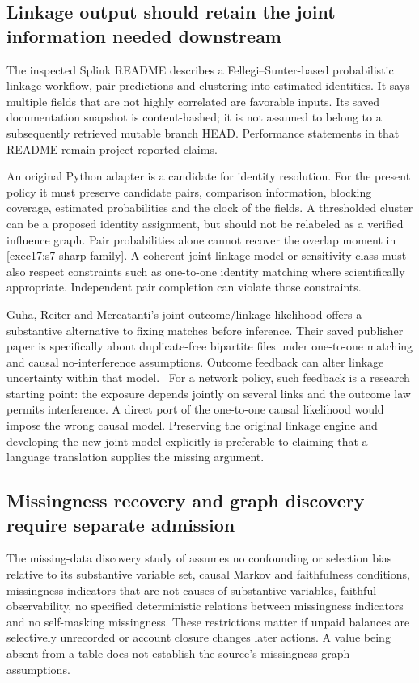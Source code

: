 \subsection{Linkage output should retain the joint information needed downstream}

The inspected Splink README describes a Fellegi--Sunter-based probabilistic
linkage workflow, pair predictions and clustering into estimated identities.
It says multiple fields that are not highly correlated are favorable inputs.
Its saved documentation snapshot is content-hashed; it is not assumed to
belong to a subsequently retrieved mutable branch HEAD. Performance statements
in that README remain project-reported claims.~\citep{sw_splink}

An original Python adapter is a candidate for identity resolution. For the
present policy it must preserve candidate pairs, comparison information,
blocking coverage, estimated probabilities and the clock of the fields.
A thresholded cluster can be a proposed identity assignment, but should not
be relabeled as a verified influence graph. Pair probabilities alone cannot
recover the overlap moment in \eqref{exec17:s7-sharp-family}. A coherent joint
linkage model or sensitivity class must also respect constraints such as
one-to-one identity matching where scientifically appropriate. Independent
pair completion can violate those constraints.

Guha, Reiter and Mercatanti's joint outcome/linkage likelihood offers a
substantive alternative to fixing matches before inference. Their saved
publisher paper is specifically about duplicate-free bipartite files under
one-to-one matching and causal no-interference assumptions. Outcome feedback
can alter linkage uncertainty within that model.~\citep{guha2022} For a network
policy, such feedback is a research starting point: the exposure depends
jointly on several links and the outcome law permits interference. A direct
port of the one-to-one causal likelihood would impose the wrong causal model.
Preserving the original linkage engine and developing the new joint model
explicitly is preferable to claiming that a language translation supplies the
missing argument.

\subsection{Missingness recovery and graph discovery require separate admission}

The missing-data discovery study of \citet{tu2019} assumes no confounding or
selection bias relative to its substantive variable set, causal Markov and
faithfulness conditions, missingness indicators that are not causes of
substantive variables, faithful observability, no specified deterministic
relations between missingness indicators and no self-masking missingness.
These restrictions matter if unpaid balances are selectively unrecorded or
account closure changes later actions. A value being absent from a table
does not establish the source's missingness graph assumptions.

